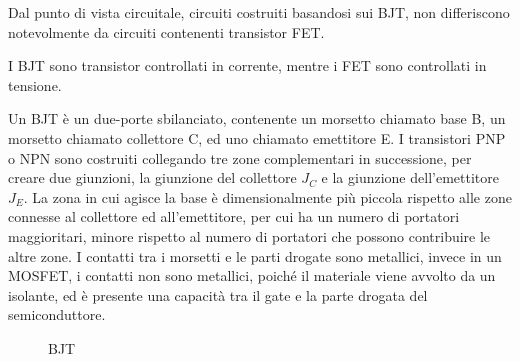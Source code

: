 \documentclass{article}
\numberwithin{equation}{subsection}
\begin{document}
Dal punto di vista circuitale, circuiti costruiti basandosi sui BJT, non differiscono notevolmente da circuiti contenenti transistor FET. 

I BJT sono transistor controllati in corrente, mentre i FET sono controllati in tensione. 


Un BJT è un due-porte sbilanciato, contenente un morsetto chiamato base B, un morsetto chiamato collettore C, ed uno chiamato emettitore E. I transistori PNP o NPN sono 
costruiti collegando tre zone complementari in successione, per creare due giunzioni, la giunzione del collettore $J_C$ e la giunzione dell'emettitore $J_E$. 
La zona in cui agisce la base è dimensionalmente più piccola rispetto alle zone connesse al collettore ed all'emettitore, per cui ha un numero di portatori maggioritari, minore 
rispetto al numero di portatori che possono contribuire le altre zone. 
I contatti tra i morsetti e le parti drogate sono metallici, 
invece in un MOSFET, i contatti non sono metallici, poiché il materiale viene avvolto da un isolante, ed è presente una capacità tra il gate e la parte drogata del 
semiconduttore. 
\begin{figure}[H]%
    \centering
    \qquad
    \caption{BJT}
    \label{fig:bjt}
\end{figure}
\end{document}
